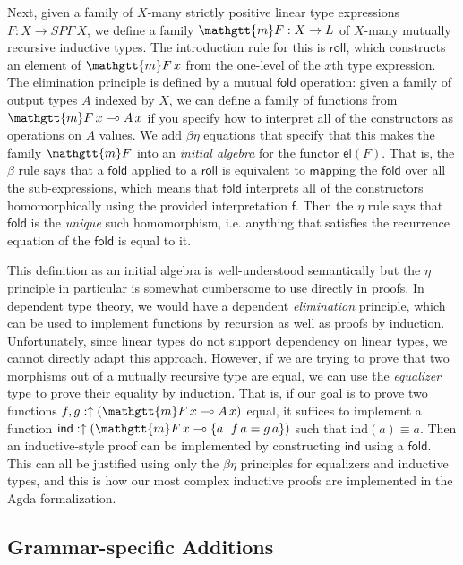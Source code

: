 \documentclass[acmsmall,nonacm]{acmart}
\renewcommand{\mu}{\mathgtt{m}}
\newcommand{\SPF}{SPF}
\newcommand{\roll}{\mathsf{roll}}
\newcommand{\fold}{\mathsf{fold}}
\newcommand{\lto}{\multimap}
\newcommand{\el}{\mathsf{el}}
\newcommand{\applto}[2]{#1 \, #2}
\newcommand{\equalizer}[3]{\{#1\,|\,\applto {#2}{#1} = \applto{#3}{#1} \}}
\newif\ifdraft
\newcommand{\pedro}[1]{\ifdraft{\color{red}[{\bf Pedro says}: #1]}\fi}
\begin{document}
{Next, given a family of $X$-many strictly positive linear type
expressions $F : X \to \SPF\,X$, we define a family $\mu F : X \to L$
of $X$-many mutually recursive inductive types. The introduction rule
for this is $\roll$, which constructs an element of $\mu F\,x$ from
the one-level of the $x$th type expression. The elimination principle
is defined by a mutual $\fold$ operation: given a family of output
types $A$ indexed by $X$, we can define a family of functions from
$\mu F\,x \multimap A\,x$ if you specify how to interpret all of the
constructors as operations on $A$ values. We add $\beta\eta$ equations
that specify that this makes the family $\mu F$ into an \emph{initial
algebra} for the functor $\el(F)$. That is, the $\beta$ rule says that
a $\mathsf{fold}$ applied to a $\mathsf{roll}$ is equivalent to
$\mathsf{map}$ping the $\mathsf{fold}$ over all the sub-expressions,
which means that $\mathsf{fold}$ interprets all of the constructors
homomorphically using the provided interpretation $\mathsf{f}$. Then
the $\eta$ rule says that $\mathsf{fold}$ is the \emph{unique} such
homomorphism, i.e. anything that satisfies the recurrence equation of
the $\mathsf{fold}$ is equal to it.

This definition as an initial algebra is well-understood semantically
but the $\eta$ principle in particular is somewhat cumbersome to use
directly in proofs. In dependent type theory, we would have a
dependent \emph{elimination} principle, which can be used to
implement functions by recursion as well as proofs by
induction. Unfortunately, since linear types do not support dependency on
linear types, we cannot directly adapt this approach. However, if we
are trying to prove that two morphisms out of a mutually recursive
type are equal, we can use the \emph{equalizer} type to prove their
equality by induction. That is, if our goal is to prove two functions
$f,g : \uparrow(\mu F\,x \lto A\,x)$ equal, it suffices to
implement a function $\mathsf{ind} : \uparrow(\mu F\,x \lto \equalizer
{a} f g)$ such that $\textrm{ind}(a) \equiv a$. Then an
inductive-style proof can be implemented by constructing
$\mathsf{ind}$ using a $\fold$. This can all be justified using only
the $\beta\eta$ principles for equalizers and inductive types, and
this is how our most complex inductive proofs are implemented in the Agda
formalization.
\pedro{I don't like the inductive proof explanation above, but I
  don't know how I would phrase it}

\subsection{Grammar-specific Additions}

}
\end{document}
